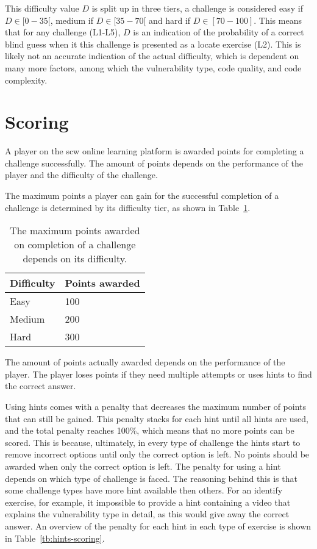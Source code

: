 This difficulty value $D$ is split up in three tiers, a challenge is considered easy if $D \in [0-35[$, medium if $D \in [35-70[$ and hard if $D \in [70-100]$. This means that for any challenge (L1-L5), $D$ is an indication of the probability of a correct blind guess when it this challenge is presented as a locate exercise (L2). This is likely not an accurate indication of the actual difficulty, which is dependent on many more factors, among which the vulnerability type, code quality, and code complexity.

\section{Scoring}
\label{sec:scoring}
A player on the \gls{scw} online learning platform is awarded points for completing a challenge successfully. 
The amount of points depends on the performance of the player and the difficulty of the challenge.

The maximum points a player can gain for the successful completion of a challenge is determined by its difficulty tier, as shown in Table~\ref{tb:points}.

\begin{table}
\centering
\caption[Points awarded for each difficulty on the SCW platform]{The maximum points awarded on completion of a challenge depends on its difficulty.}
\begin{tabular}{ll} 
 Difficulty &  Points awarded\\
 \hline
 Easy & 100\\
 Medium & 200\\
 Hard & 300\\
\end{tabular}

\label{tb:points}
\end{table}

The amount of points actually awarded depends on the performance of the player. The player loses points if they need multiple attempts or uses hints to find the correct answer.

Using hints comes with a penalty that decreases the maximum number of points that can still be gained. This penalty stacks for each hint until all hints are used, and the total penalty reaches 100\%, which means that no more points can be scored. 
This is because, ultimately, in every type of challenge the hints start to remove incorrect options until only the correct option is left. 
No points should be awarded when only the correct option is left.
The penalty for using a hint depends on which type of challenge is faced. The reasoning behind this is that some challenge types have more hint available then others. 
For an identify exercise, for example, it impossible to provide a hint containing a video that explains the vulnerability type in detail, as this would give away the correct answer.
An overview of the penalty for each hint in each type of exercise is shown in Table~\ref{tb:hints-scoring}.

